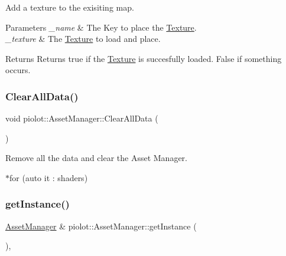 Add a texture to the exisiting map. 


\begin{DoxyParams}{Parameters}
{\em \+\_\+name} & The Key to place the \mbox{\hyperlink{classpiolot_1_1_texture}{Texture}}. \\
\hline
{\em \+\_\+texture} & The \mbox{\hyperlink{classpiolot_1_1_texture}{Texture}} to load and place. \\
\hline
\end{DoxyParams}
\begin{DoxyReturn}{Returns}
Returns true if the \mbox{\hyperlink{classpiolot_1_1_texture}{Texture}} is succesfully loaded. False if something occurs. 
\end{DoxyReturn}
\mbox{\label{classpiolot_1_1_asset_manager_ab6e938de7632862bfbe0a673b6c53b21}} 
\subsubsection{\texorpdfstring{Clear\+All\+Data()}{ClearAllData()}}
{\footnotesize\ttfamily void piolot\+::\+Asset\+Manager\+::\+Clear\+All\+Data (\begin{DoxyParamCaption}{ }\end{DoxyParamCaption})\hspace{0.3cm}{\ttfamily [inline]}}



Remove all the data and clear the Asset Manager. 

$\ast$for (auto it \+: shaders) \mbox{\label{classpiolot_1_1_asset_manager_a5bcfd6d2719bcada7f5865eb6e39664b}} 
\subsubsection{\texorpdfstring{get\+Instance()}{getInstance()}}
{\footnotesize\ttfamily \mbox{\hyperlink{classpiolot_1_1_asset_manager}{Asset\+Manager}} \& piolot\+::\+Asset\+Manager\+::get\+Instance (\begin{DoxyParamCaption}{ }\end{DoxyParamCaption})\hspace{0.3cm}{\ttfamily [inline]}, {\ttfamily [static]}}




